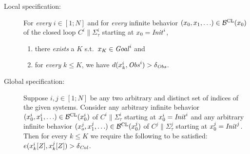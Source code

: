 \begin{description}
	\item[Local specification:] For \emph{every} $i\in [1;N]$ and for \emph{every} infinite behavior $(x_0,x_1,\ldots)\in \mathcal{B}^{\mathrm{CL}}(x_0)$ of the closed loop $C^i\parallel \Sigma_\tau^i$ starting at $x_0=\mathit{Init}^i$,
		\begin{enumerate}
			\item there \emph{exists} a $K$ s.t.\ $x_K\in \mathit{Goal}^i$ and
			 \item for \emph{every} $k\leq K$, we have $d(x^i_k,\mathit{Obs}^i)>\delta_{\mathit{Obs}}$.
		\end{enumerate}
	\item[Global specification:] 
		Suppose $i,j\in [1;N]$ be any two arbitrary and distinct set of indices of the given systems.
		Consider any arbitrary infinite behavior $(x_0^i,x_1^i,\ldots)\in \mathcal{B}^{\mathrm{CL}}(x_0^i)$ of $C^i\parallel \Sigma_\tau^i$ starting at $x_0^i=\mathit{Init}^i$ 
		and any arbitrary infinite behavior $(x_o^j, x_1^j,\ldots)\in \mathcal{B}^{\mathrm{CL}}(x_0^j)$ of $C^j\parallel \Sigma_\tau^j$ starting at $x_0^j=\mathit{Init}^j$. 
		Then for every $k\leq K$ we require the following to be satisfied: $e(x^i_k[Z],x^j_k[Z])>\delta_{\mathit{Col}}$.
\end{description}

